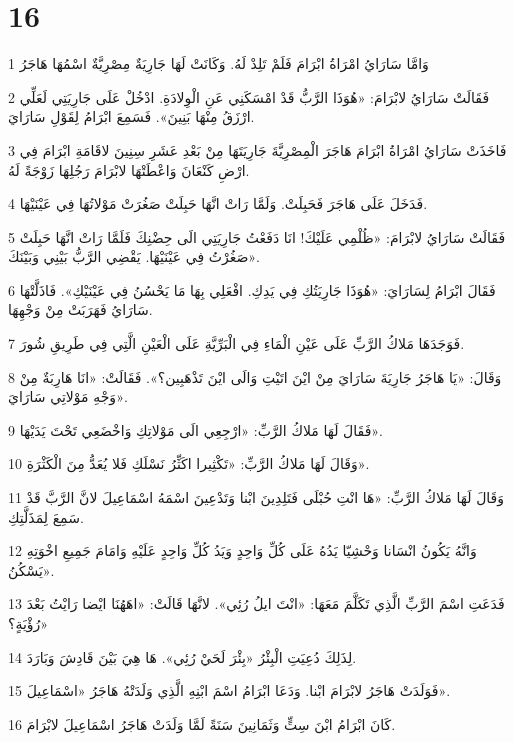 \chapter{16}

\par 1 وَامَّا سَارَايُ امْرَاةُ ابْرَامَ فَلَمْ تَلِدْ لَهُ. وَكَانَتْ لَهَا جَارِيَةٌ مِصْرِيَّةٌ اسْمُهَا هَاجَرُ
\par 2 فَقَالَتْ سَارَايُ لابْرَامَ: «هُوَذَا الرَّبُّ قَدْ امْسَكَنِي عَنِ الْوِلادَةِ. ادْخُلْ عَلَى جَارِيَتِي لَعَلِّي ارْزَقُ مِنْهَا بَنِينَ». فَسَمِعَ ابْرَامُ لِقَوْلِ سَارَايَ.
\par 3 فَاخَذَتْ سَارَايُ امْرَاةُ ابْرَامَ هَاجَرَ الْمِصْرِيَّةَ جَارِيَتَهَا مِنْ بَعْدِ عَشَرِ سِنِينَ لاقَامَةِ ابْرَامَ فِي ارْضِ كَنْعَانَ وَاعْطَتْهَا لابْرَامَ رَجُلِهَا زَوْجَةً لَهُ.
\par 4 فَدَخَلَ عَلَى هَاجَرَ فَحَبِلَتْ. وَلَمَّا رَاتْ انَّهَا حَبِلَتْ صَغُرَتْ مَوْلاتُهَا فِي عَيْنَيْهَا.
\par 5 فَقَالَتْ سَارَايُ لابْرَامَ: «ظُلْمِي عَلَيْكَ! انَا دَفَعْتُ جَارِيَتِي الَى حِضْنِكَ فَلَمَّا رَاتْ انَّهَا حَبِلَتْ صَغُرْتُ فِي عَيْنَيْهَا. يَقْضِي الرَّبُّ بَيْنِي وَبَيْنَكَ».
\par 6 فَقَالَ ابْرَامُ لِسَارَايَ: «هُوَذَا جَارِيَتُكِ فِي يَدِكِ. افْعَلِي بِهَا مَا يَحْسُنُ فِي عَيْنَيْكِ». فَاذَلَّتْهَا سَارَايُ فَهَرَبَتْ مِنْ وَجْهِهَا.
\par 7 فَوَجَدَهَا مَلاكُ الرَّبِّ عَلَى عَيْنِ الْمَاءِ فِي الْبَرِّيَّةِ عَلَى الْعَيْنِ الَّتِي فِي طَرِيقِ شُورَ.
\par 8 وَقَالَ: «يَا هَاجَرُ جَارِيَةَ سَارَايَ مِنْ ايْنَ اتَيْتِ وَالَى ايْنَ تَذْهَبِين؟». فَقَالَتْ: «انَا هَارِبَةٌ مِنْ وَجْهِ مَوْلاتِي سَارَايَ».
\par 9 فَقَالَ لَهَا مَلاكُ الرَّبِّ: «ارْجِعِي الَى مَوْلاتِكِ وَاخْضَعِي تَحْتَ يَدَيْهَا».
\par 10 وَقَالَ لَهَا مَلاكُ الرَّبِّ: «تَكْثِيرا اكَثِّرُ نَسْلَكِ فَلا يُعَدُّ مِنَ الْكَثْرَةِ».
\par 11 وَقَالَ لَهَا مَلاكُ الرَّبِّ: «هَا انْتِ حُبْلَى فَتَلِدِينَ ابْنا وَتَدْعِينَ اسْمَهُ اسْمَاعِيلَ لانَّ الرَّبَّ قَدْ سَمِعَ لِمَذَلَّتِكِ.
\par 12 وَانَّهُ يَكُونُ انْسَانا وَحْشِيّا يَدُهُ عَلَى كُلِّ وَاحِدٍ وَيَدُ كُلِّ وَاحِدٍ عَلَيْهِ وَامَامَ جَمِيعِ اخْوَتِهِ يَسْكُنُ».
\par 13 فَدَعَتِ اسْمَ الرَّبِّ الَّذِي تَكَلَّمَ مَعَهَا: «انْتَ ايلُ رُئِي». لانَّهَا قَالَتْ: «اهَهُنَا ايْضا رَايْتُ بَعْدَ رُؤْيَةٍ؟»
\par 14 لِذَلِكَ دُعِيَتِ الْبِئْرُ «بِئْرَ لَحَيْ رُئِي». هَا هِيَ بَيْنَ قَادِشَ وَبَارَدَ.
\par 15 فَوَلَدَتْ هَاجَرُ لابْرَامَ ابْنا. وَدَعَا ابْرَامُ اسْمَ ابْنِهِ الَّذِي وَلَدَتْهُ هَاجَرُ «اسْمَاعِيلَ».
\par 16 كَانَ ابْرَامُ ابْنَ سِتٍّ وَثَمَانِينَ سَنَةً لَمَّا وَلَدَتْ هَاجَرُ اسْمَاعِيلَ لابْرَامَ.

